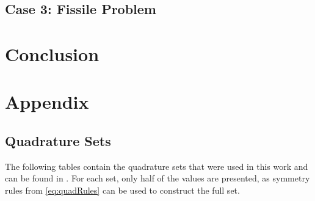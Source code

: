 \documentclass{article}
\begin{document}
\subsection{Case 3: Fissile Problem} \label{sec:fissile}

\section{Conclusion} 




\section{Appendix}

\subsection{Quadrature Sets} \label{sec:qsets}
The following tables contain the quadrature sets that were used in this work and can be found
in \cite{lewis1984computational}.
For each set, only half of the values are presented, as symmetry rules from \cref{eq:quadRules}
can be used to construct the full set.



\end{document}
